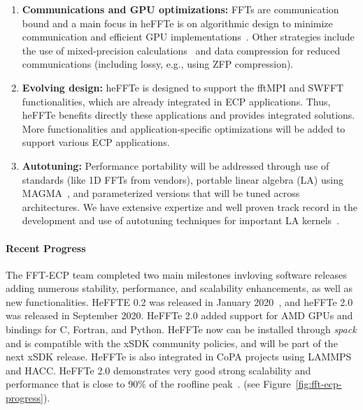 \begin{enumerate}
\item
\textbf{Communications and GPU optimizations:}
FFTs are communication bound and a main focus in heFFTe is on algorithmic
design to minimize communication and efficient GPU implementations~\cite{sc19,eurompi19}.
Other strategies include the use of mixed-precision calculations~\cite{Haidar2018,tcfft18}
and data compression for reduced communications (including lossy, e.g., using ZFP compression).
\item
\textbf{Evolving design:}
heFFTe is designed to support the fftMPI and SWFFT functionalities,
which are already integrated in ECP applications. Thus, heFFTe benefits
directly these applications and provides integrated solutions. 
More functionalities and application-specific optimizations will be added 
to support various ECP applications. 
\item
\textbf{Autotuning:}
Performance portability will be addressed through use of standards (like 1D FFTs 
from vendors), portable linear algebra (LA) using MAGMA~\cite{Tomov_2010_pcsa}, 
and parameterized versions that will be tuned across architectures. We have extensive 
expertize and well proven track record in the development and use of autotuning techniques 
for important LA kernels~\cite{Nath2010,Kurzak2012gemmfermi}. 
\end{enumerate}

\paragraph{Recent Progress}
The FFT-ECP team completed two main milestones invloving software releases adding 
numerous stability, performance, and scalability enhancements, as well as new functionalities. 
HeFFTE 0.2 was released in January 2020~\cite{heffte0.2}, and heFFTe 2.0 was released in September 
2020. HeFFTe 2.0 added support for AMD GPUs and bindings for C, Fortran, and Python.
HeFFTe now can be installed through {\it spack} and is compatible with the xSDK community 
policies, and will be part of the next xSDK release. HeFFTe is also integrated in
CoPA projects using LAMMPS and HACC. HeFFTe 2.0 demonstrates very good strong 
scalability and performance that is close to 90\% of the roofline peak~\cite{heffte-iccs20}. 
(see Figure~\ref{fig:fft-ecp-progress}).


